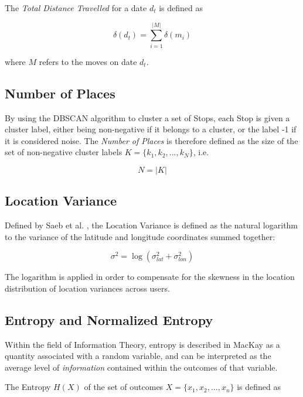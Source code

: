 The \textit{Total Distance Travelled} for a date $d_t$ is defined as 

\begin{equation}
\label{eq:feature-total-distance}
\delta (d_t) = \sum_{i=1}^{|M|} \delta (m_i)
\end{equation}

where $M$ refers to the moves on date $d_t$.

\subsection{Number of Places}
By using the DBSCAN algorithm to cluster a set of Stops, each Stop is given a cluster label, either being non-negative if it belongs to a cluster, or the label -1 if it is considered noise. The \textit{Number of Places} is therefore defined as the size of the set of non-negative cluster labels $K = \{k_1, k_2, ..., k_N\}$, i.e.

\begin{equation}
\label{eq:feature-num-places}
N = |K|
\end{equation}

\subsection{Location Variance}
Defined by Saeb et al. \cite{Saeb2015}, the Location Variance is defined as the natural logarithm to the variance of the latitude and longitude coordinates summed together: 

\begin{equation}
\label{eq:feature-log-var}
\sigma^2 = \log (\sigma_{lat}^2 + \sigma_{lon}^2)
\end{equation}

The logarithm is applied in order to compensate for the skewness in the location distribution of location variances across users.

\subsection{Entropy and Normalized Entropy}
Within the field of Information Theory, entropy is described in MacKay \cite{information-theory} as a quantity associated with a random variable, and can be interpreted as the average level of \textit{information} contained within the outcomes of that variable. 

The Entropy $H(X)$ of the set of outcomes $X = \{x_1, x_2, ..., x_n\}$ is defined as

